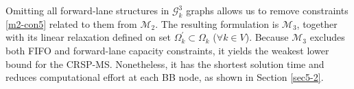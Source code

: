 \documentclass[12pt]{article}
\begin{document}

Omitting all forward-lane structures in $\mathcal{G}^3_k$ graphs allows us to remove constraints \eqref{m2-con5} related to them from $\mathcal{M}_2$. The resulting formulation is $\mathcal{M}_3$, together with its linear relaxation defined on set $\Omega^{\prime}_{k}\subset \Omega_k$ ($\forall k\in V$). %
Because $\mathcal{M}_3$ excludes both FIFO and forward-lane capacity constraints, it yields the weakest lower bound for the CRSP-MS. Nonetheless, it has the shortest solution time and reduces computational effort at each BB node, as shown in Section \ref{sec5-2}.



\end{document}
